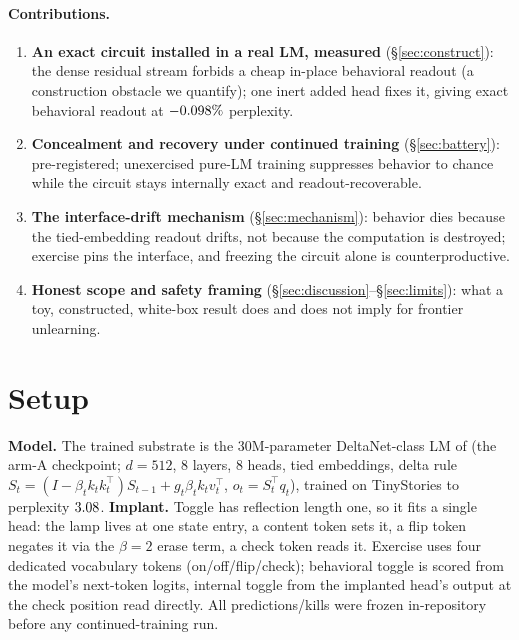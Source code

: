 \documentclass[10pt]{article}
\begin{document}
\paragraph{Contributions.}
\begin{enumerate}
\item \textbf{An exact circuit installed in a real LM, measured} (\S\ref{sec:construct}): the dense
residual stream forbids a cheap in-place behavioral readout (a construction obstacle we quantify);
one inert added head fixes it, giving exact behavioral readout at $-0.098\%$ perplexity.
\item \textbf{Concealment and recovery under continued training} (\S\ref{sec:battery}): pre-registered;
unexercised pure-LM training suppresses behavior to chance while the circuit stays internally exact and
readout-recoverable.
\item \textbf{The interface-drift mechanism} (\S\ref{sec:mechanism}): behavior dies because the
tied-embedding readout drifts, not because the computation is destroyed; exercise pins the interface,
and freezing the circuit alone is counterproductive.
\item \textbf{Honest scope and safety framing} (\S\ref{sec:discussion}--\S\ref{sec:limits}): what a
toy, constructed, white-box result does and does not imply for frontier unlearning.
\end{enumerate}

\section{Setup}\label{sec:setup}
\textbf{Model.} The trained substrate is the $30$M-parameter DeltaNet-class LM of
\citet{howe2026hygiene} (the arm-A checkpoint; $d{=}512$, $8$ layers, $8$ heads, tied embeddings,
delta rule $S_t{=}(I-\beta_t k_t k_t^\top)S_{t-1}+g_t\beta_t k_t v_t^\top$, $o_t{=}S_t^\top q_t$),
trained on TinyStories \citep{eldan2023tinystories} to perplexity $3.08$.
\textbf{Implant.} Toggle has reflection length one, so it fits a single head: the lamp lives at one
state entry, a content token sets it, a flip token negates it via the $\beta{=}2$ erase term, a check
token reads it. Exercise uses four dedicated vocabulary tokens (on/off/flip/check); behavioral toggle
is scored from the model's next-token logits, internal toggle from the implanted head's output at the
check position read directly. All predictions/kills were frozen in-repository before any
continued-training run.
\end{document}
